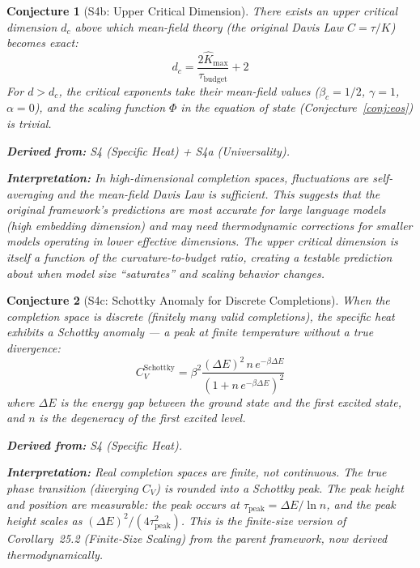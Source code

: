 \documentclass[11pt,letterpaper]{article}
\newtheorem{conjecture}{Conjecture}[section]
\newcommand{\Khat}{\hat{K}}
\newcommand{\tbudget}{\tau_{\mathrm{budget}}}
\begin{document}
\begin{conjecture}[S4b: Upper Critical 
Dimension]\label{conj:upper_critical}
There exists an upper critical dimension $d_c$ above which mean-field 
theory (the original Davis Law $C = \tau/K$) becomes exact:
\begin{equation}
    d_c = \frac{2\Khat_{\max}}{\tbudget} + 2
\end{equation}
For $d > d_c$, the critical exponents take their mean-field values 
($\beta_c = 1/2$, $\gamma = 1$, $\alpha = 0$), and the scaling function 
$\Phi$ in the equation of state (Conjecture~\ref{conj:eos}) is trivial.

\textbf{Derived from:} S4 (Specific Heat) + S4a (Universality).

\textbf{Interpretation:} In high-dimensional completion spaces, 
fluctuations are self-averaging and the mean-field Davis Law is sufficient. 
This suggests that the original framework's predictions are most accurate 
for \emph{large} language models (high embedding dimension) and may need 
thermodynamic corrections for smaller models operating in lower effective 
dimensions. The upper critical dimension is itself a function of the 
curvature-to-budget ratio, creating a testable prediction about when 
model size ``saturates'' and scaling behavior changes.
\end{conjecture}

\begin{conjecture}[S4c: Schottky Anomaly for Discrete 
Completions]\label{conj:schottky}
When the completion space is discrete (finitely many valid completions), 
the specific heat exhibits a Schottky anomaly --- a peak at finite 
temperature without a true divergence:
\begin{equation}
    C_V^{\mathrm{Schottky}} = \beta^2 \frac{(\Delta E)^2 \, 
    n \, e^{-\beta \Delta E}}{(1 + n \, e^{-\beta \Delta E})^2}
\end{equation}
where $\Delta E$ is the energy gap between the ground state and the first 
excited state, and $n$ is the degeneracy of the first excited level.

\textbf{Derived from:} S4 (Specific Heat).

\textbf{Interpretation:} Real completion spaces are finite, not 
continuous. The true phase transition (diverging $C_V$) is rounded into 
a Schottky peak. The peak height and position are measurable: the peak 
occurs at $\tau_{\mathrm{peak}} = \Delta E / \ln n$, and the peak height 
scales as $(\Delta E)^2 / (4\tau_{\mathrm{peak}}^2)$. This is the finite-size 
version of Corollary~25.2 (Finite-Size Scaling) from the parent framework, 
now derived thermodynamically.
\end{conjecture}
\end{document}
